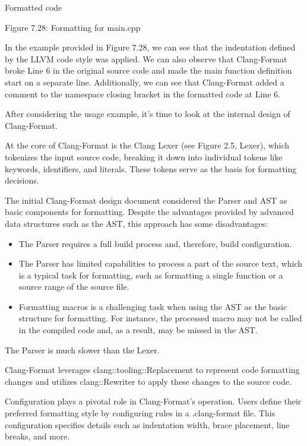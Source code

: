Formatted code

\begin{center}
Figure 7.28: Formatting for main.cpp
\end{center}

In the example provided in Figure 7.28, we can see that the indentation defined by the LLVM code style was applied. We can also observe that Clang-Format broke Line 6 in the original source code and made the main function definition start on a separate line. Additionally, we can see that Clang-Format added a comment to the namespace closing bracket in the formatted code at Line 6.

After considering the usage example, it's time to look at the internal design of Clang-Format.


At the core of Clang-Format is the Clang Lexer (see Figure 2.5, Lexer), which tokenizes the input source code, breaking it down into individual tokens like keywords, identifiers, and literals. These tokens serve as the basis for formatting decisions.

The initial Clang-Format design document considered the Parser and AST as basic components for formatting. Despite the advantages provided by advanced data structures such as the AST, this approach has some disadvantages:

\begin{itemize}
\item
The Parser requires a full build process and, therefore, build configuration.

\item
The Parser has limited capabilities to process a part of the source text, which is a typical task for formatting, such as formatting a single function or a source range of the source file.

\item
Formatting macros is a challenging task when using the AST as the basic structure for formatting. For instance, the processed macro may not be called in the compiled code and, as a result, may be missed in the AST.
\end{itemize}

The Parser is much slower than the Lexer.

Clang-Format leverages clang::tooling::Replacement to represent code formatting changes and utilizes clang::Rewriter to apply these changes to the source code.

Configuration plays a pivotal role in Clang-Format's operation. Users define their preferred formatting style by configuring rules in a .clang-format file. This configuration specifies details such as indentation width, brace placement, line breaks, and more.

